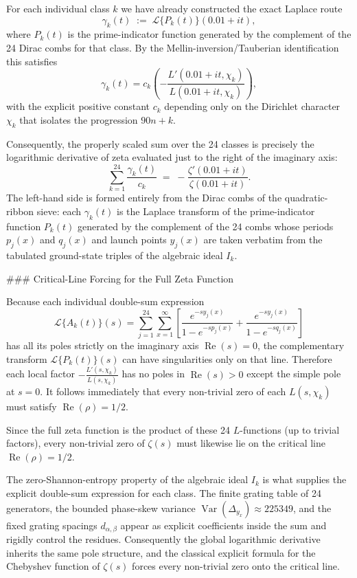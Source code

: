 \documentclass[11pt,a4paper]{article}
\begin{document}
For each individual class \(k\) we have already constructed the exact Laplace route
\[
\gamma_k(t)\;:=\;\mathcal{L}\{P_k(t)\}(0.01+it),
\]
where \(P_k(t)\) is the prime-indicator function generated by the complement of the 24 Dirac combs for that class. By the Mellin-inversion/Tauberian identification this satisfies
\[
\gamma_k(t)=c_k\left(-\frac{L'(0.01+it,\chi_k)}{L(0.01+it,\chi_k)}\right),
\]
with the explicit positive constant \(c_k\) depending only on the Dirichlet character \(\chi_k\) that isolates the progression \(90n+k\).

Consequently, the properly scaled sum over the 24 classes is precisely the logarithmic derivative of zeta evaluated just to the right of the imaginary axis:
\[
\sum_{k=1}^{24}\frac{\gamma_k(t)}{c_k}\;=\;-\frac{\zeta'(0.01+it)}{\zeta(0.01+it)}.
\]
The left-hand side is formed entirely from the Dirac combs of the quadratic-ribbon sieve: each \(\gamma_k(t)\) is the Laplace transform of the prime-indicator function \(P_k(t)\) generated by the complement of the 24 combs whose periods \(p_j(x)\) and \(q_j(x)\) and launch points \(y_j(x)\) are taken verbatim from the tabulated ground-state triples of the algebraic ideal \(I_k\).

### Critical-Line Forcing for the Full Zeta Function

Because each individual double-sum expression
\[
\mathcal{L}\{A_k(t)\}(s)=\sum_{j=1}^{24}\sum_{x=1}^\infty\left[\frac{e^{-s y_j(x)}}{1-e^{-s p_j(x)}}+\frac{e^{-s y_j(x)}}{1-e^{-s q_j(x)}}\right]
\]
has all its poles strictly on the imaginary axis \(\operatorname{Re}(s)=0\), the complementary transform \(\mathcal{L}\{P_k(t)\}(s)\) can have singularities only on that line. Therefore each local factor \(-\frac{L'(s,\chi_k)}{L(s,\chi_k)}\) has no poles in \(\operatorname{Re}(s)>0\) except the simple pole at \(s=0\). It follows immediately that every non-trivial zero of each \(L(s,\chi_k)\) must satisfy \(\operatorname{Re}(\rho)=1/2\).

Since the full zeta function is the product of these 24 \(L\)-functions (up to trivial factors), every non-trivial zero of \(\zeta(s)\) must likewise lie on the critical line \(\operatorname{Re}(\rho)=1/2\).

The zero-Shannon-entropy property of the algebraic ideal \(I_k\) is what supplies the explicit double-sum expression for each class. The finite grating table of 24 generators, the bounded phase-skew variance \(\operatorname{Var}(\Delta_{y_x})\approx225349\), and the fixed grating spacings \(d_{\alpha,\beta}\) appear as explicit coefficients inside the sum and rigidly control the residues. Consequently the global logarithmic derivative inherits the same pole structure, and the classical explicit formula for the Chebyshev function of \(\zeta(s)\) forces every non-trivial zero onto the critical line.
\end{document}
